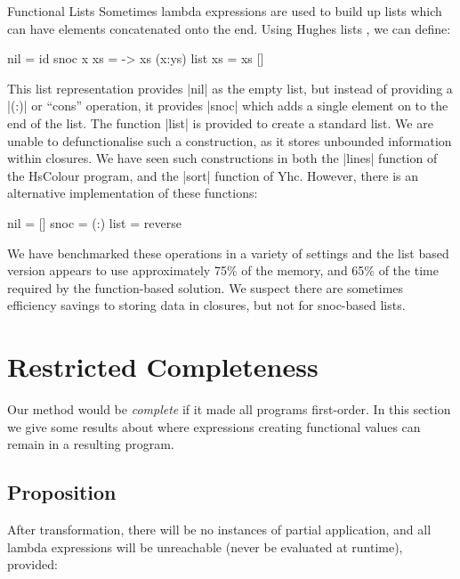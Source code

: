 \documentclass[preprint]{sigplanconf}
\begin{document}
\begin{examplename}{Functional Lists}
\label{ex:functional_lists}
Sometimes lambda expressions are used to build up lists which can have elements concatenated onto the end. Using Hughes lists \cite{hughes:lists}, we can define:

\begin{code}
nil = id
snoc x xs = \ys -> xs (x:ys)
list xs = xs []
\end{code}

This list representation provides |nil| as the empty list, but instead of providing a |(:)| or ``cons'' operation, it provides |snoc| which adds a single element on to the end of the list. The function |list| is provided to create a standard list. We are unable to defunctionalise such a construction, as it stores unbounded information within closures. We have seen such constructions in both the |lines| function of the HsColour program, and the |sort| function of Yhc. However, there is an alternative implementation of these functions:

\begin{code}
nil = []
snoc = (:)
list = reverse
\end{code}

We have benchmarked these operations in a variety of settings and the list based version appears to use approximately 75\% of the memory, and 65\% of the time required by the function-based solution. We suspect there are sometimes efficiency savings to storing data in closures, but not for snoc-based lists.
\end{examplename}


\section{Restricted Completeness}
\label{sec:completeness}


Our method would be \textit{complete} if it made all programs first-order. In this section we give some results about where expressions creating functional values can remain in a resulting program.

\subsection{Proposition}

After transformation, there will be no instances of partial application, and all lambda expressions will be unreachable (never be evaluated at runtime), provided:
\end{document}
